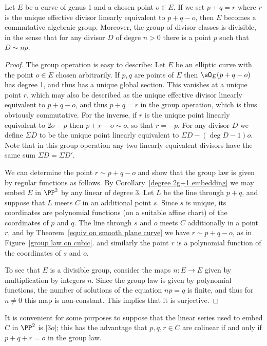 \begin{proposition}\label{group law} Let $E$ be a curve of genus 1 and a chosen point $o\in E$.
If we set $p+q = r$ where $r$ is the unique effective divisor linearly equivalent to $p+q-o$, then $E$ becomes a
commutative algebraic group.
Moreover, the group of divisor classes is divisible, in the sense that for any divisor $D$ of degre $n>0$
 there is a point $p$ such that $D\sim np$.
 \end{proposition}

\begin{proof}
 The group operation is easy to describe:
Let $E$ be an elliptic curve with the point $o\in E$ chosen arbitrarily. If $p,q$ are points of $E$ then $\sO_E(p+q-o)$ has degree 1, and
thus has a unique global section. This vanishes at a unique point $r$, which may also be described as the unique
effective divisor linearly equivalent to $p+q-o$, and thus 
$p+q = r$ in the group operation, which is thus obviously commutative. For the inverse, if $r$ is the  unique point
linearly equivalent to $2o-p$ then $p+r-o\sim o$, so that $r=-p$. For any divisor $D$
we define $\Sigma D$ to be the unique point linearly equivalent to $\Sigma D-(\deg D-1)o$.
Note that in this group operation any two linearly
equivalent divisors have the same sum $\Sigma D = \Sigma D'$.

We can determine the point $r\sim p+q-o$ and show that the group law is given by regular functions
as follows. By Corollary~\ref{degree 2g+1 embedding} we may embed $E$ in $\PP^2$ by any linear
of degree 3.  Let $L$ be the line through $p+q$, and suppose that
$L$ meets $C$ in an additional point $s$. Since $s$ is unique, its coordinates are polynomial functions
(on a suitable affine chart) of the coordinates of $p$ and $q$. The line through $s$ and $o$ meets $C$ additionally in a point $r$,
and by Theorem~\ref{equiv on smooth plane curve} we have $r\sim p+q-o$, as in Figure~\ref{group law on cubic}.
and similarly the point $r$ is a polynomial function of the coordinates of $s$ and $o$.

To see that $E$ is a divisible group, consider the maps $n: E\to E$ given by multiplication by integers $n$. Since the
group law is given by polynomial functions, the number of solutions of the equation $np = q$ is finite, and thus
for $n\neq 0$ this map is non-constant. This implies that it is surjective.
\end{proof}

It is convenient for some purposes to suppose that the linear series used to embed $C$ in $\PP^2$ is $|3o|$; this
has the advantage that $p,q,r\in C$ are colinear if and only if $p+q+r =o$ in the group law.

